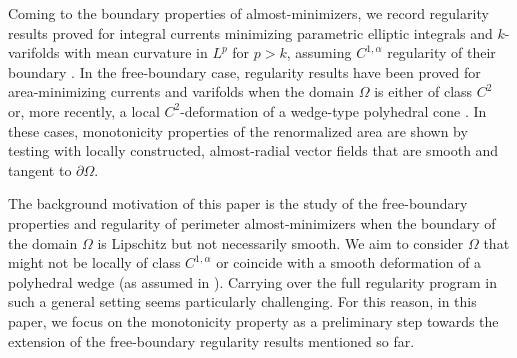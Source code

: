\documentclass[a4paper,reqno,11pt]{amsart}
\newcommand{\de}{\partial}
\begin{document}
Coming to the boundary properties of almost-minimizers, we record regularity results proved for integral currents minimizing parametric elliptic integrals and $k$-varifolds with mean curvature in $L^{p}$ for $p>k$, assuming $C^{1,\alpha}$ regularity of their boundary \cite{allard1975boundary,DuzaarSteffen2002,Bourni2016}. In the free-boundary case, regularity results have been proved for area-minimizing currents and varifolds when the domain $\Omega$ is either of class $C^{2}$ \cite{HardtSimon1979,GruterJost1986allard,Gruter1987regularity,Jost1986} or, more recently, a local $C^{2}$-deformation of a wedge-type polyhedral cone \cite{EdelenLi2022}. In these cases, monotonicity properties of the renormalized area are shown by testing with locally constructed, almost-radial vector fields that are smooth and tangent to $\de \Omega$.

The background motivation of this paper is the study of the free-boundary properties and regularity of perimeter almost-minimizers when the boundary of the domain $\Omega$ is Lipschitz but not necessarily smooth. We aim to consider $\Omega$ that might not be locally of class $C^{1,\alpha}$ or coincide with a smooth deformation of a polyhedral wedge (as assumed in \cite{EdelenLi2022}). Carrying over the full regularity program in such a general setting seems particularly challenging. For this reason, in this paper, we focus on the monotonicity property as a preliminary step towards the extension of the free-boundary regularity results mentioned so far. 
\end{document}
